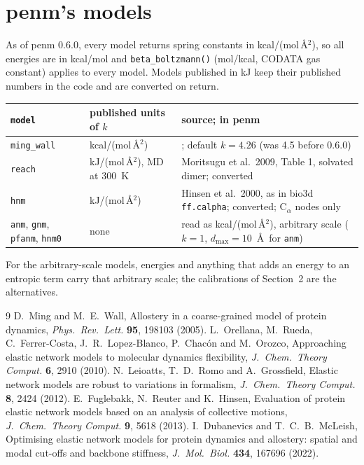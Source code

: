 \documentclass[11pt]{article}
\begin{document}
\section{penm's models}

As of penm 0.6.0, every model returns spring constants in kcal/(mol\,\AA$^2$), so all
energies are in kcal/mol and \texttt{beta\_boltzmann()} (mol/kcal, CODATA gas constant)
applies to every model. Models published in kJ keep their published numbers in the code and
are converted on return.

\begin{center}
\small
\begin{tabular}{llp{}}
\toprule
\texttt{model} & published units of $k$ & source; in penm \\
\midrule
\texttt{ming\_wall} & kcal/(mol\,\AA$^2$) & \cite{ming2005}; default $k = 4.26$ (was 4.5 before 0.6.0) \\
\texttt{reach} & kJ/(mol\,\AA$^2$), MD at 300~K & Moritsugu et al.\ 2009, Table 1, solvated dimer; converted \\
\texttt{hnm} & kJ/(mol\,\AA$^2$) & Hinsen et al.\ 2000, as in bio3d \texttt{ff.calpha}; converted; C$_\alpha$ nodes only \\
\texttt{anm}, \texttt{gnm}, \texttt{pfanm}, \texttt{hnm0} & none & read as kcal/(mol\,\AA$^2$), arbitrary scale ($k = 1$, $d_{\max} = 10$~\AA\ for \texttt{anm}) \\
\bottomrule
\end{tabular}
\end{center}

For the arbitrary-scale models, energies and anything that adds an energy to an entropic
term carry that arbitrary scale; the calibrations of Section~2 are the alternatives.

\begin{thebibliography}{9}
 D.~Ming and M.~E.~Wall, Allostery in a coarse-grained model of protein
dynamics, \emph{Phys.\ Rev.\ Lett.} \textbf{95}, 198103 (2005).
 L.~Orellana, M.~Rueda, C.~Ferrer-Costa, J.~R.~Lopez-Blanco,
P.~Chac\'on and M.~Orozco, Approaching elastic network models to molecular dynamics
flexibility, \emph{J.\ Chem.\ Theory Comput.} \textbf{6}, 2910 (2010).
 N.~Leioatts, T.~D.~Romo and A.~Grossfield, Elastic network models
are robust to variations in formalism, \emph{J.\ Chem.\ Theory Comput.} \textbf{8}, 2424
(2012).
 E.~Fuglebakk, N.~Reuter and K.~Hinsen, Evaluation of protein
elastic network models based on an analysis of collective motions, \emph{J.\ Chem.\ Theory
Comput.} \textbf{9}, 5618 (2013).
 I.~Dubanevics and T.~C.~B.~McLeish, Optimising elastic network
models for protein dynamics and allostery: spatial and modal cut-offs and backbone
stiffness, \emph{J.\ Mol.\ Biol.} \textbf{434}, 167696 (2022).
\end{thebibliography}
\end{document}
